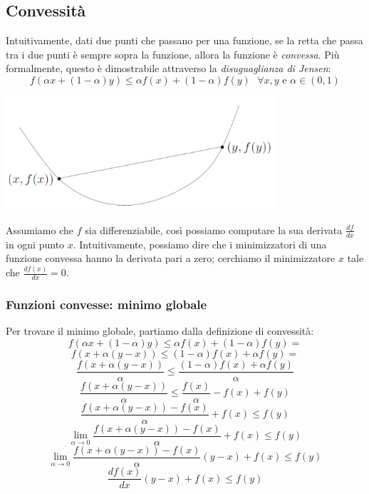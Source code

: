 \documentclass{article}
\begin{document}
        \subsection{Convessità}
            Intuitivamente, dati due punti che passano per una funzione, se la retta che passa tra i due punti è sempre sopra la funzione,
            allora la funzione è \emph{convessa}. Più formalmente, questo è dimostrabile attraverso la \emph{disuguaglianza di Jensen}:
            \[ f(\alpha x + (1-\alpha)y) \leq \alpha f(x) + (1-\alpha)f(y) \text{ }\forall x,y \text{ e }\alpha \in (0,1)\]
            \begin{center}\includegraphics[width=10cm]{jensen.png}\end{center}
            Assumiamo che $f$ sia differenziabile, così possiamo computare la sua derivata $\frac{df}{dx}$ in ogni punto $x$. Intuitivamente, possiamo 
            dire che i minimizzatori di una funzione convessa hanno la derivata pari a zero; cerchiamo il minimizzatore $x$ tale che 
            $\frac{df(x)}{dx}=0$.

            \subsubsection{Funzioni convesse: minimo globale}
                Per trovare il minimo globale, partiamo dalla definizione di convessità:
                \[f(\alpha x + (1-\alpha)y) \leq \alpha f(x) + (1-\alpha)f(y) =\]
                \[f(x + \alpha(y-x)) \leq (1-\alpha)f(x) + \alpha f(y) =\]
                \[\frac{f(x + \alpha(y-x))}{\alpha} \leq \frac{(1-\alpha)f(x) + \alpha f(y)}{\alpha}\]
                \[\frac{f(x + \alpha(y-x))}{\alpha} \leq \frac{f(x)}{\alpha} - f(x) + f(y)\]
                \[\frac{f(x + \alpha(y-x)) - f(x)}{\alpha}+f(x) \leq f(y)\]
                \[\lim_{\alpha \to 0} \frac{f(x + \alpha(y-x)) - f(x)}{\alpha}+f(x) \leq f(y)\]
                \[\lim_{\alpha \to 0} \frac{f(x + \alpha(y-x)) - f(x)}{\alpha}(y-x)+f(x) \leq f(y)\]
                \[\frac{df(x)}{dx}(y-x) + f(x) \leq f(y)\]
\end{document}
